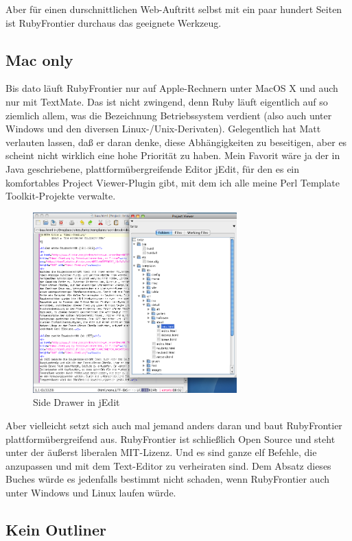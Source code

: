 \documentclass[11pt]{report}
\begin{document}
Aber für einen durschnittlichen Web-Auftritt selbst mit ein paar
hundert Seiten ist RubyFrontier durchaus das geeignete Werkzeug.
\subsection{Mac only}
\label{sec-1-1-2-4}


Bis dato läuft RubyFrontier nur auf Apple-Rechnern unter MacOS X und
auch nur mit TextMate. Das ist nicht zwingend, denn Ruby läuft
eigentlich auf so ziemlich allem, was die Bezeichnung Betriebssystem
verdient (also auch unter Windows und den diversen
Linux-/Unix-Derivaten). Gelegentlich hat Matt verlauten lassen, daß er
daran denke, diese Abhängigkeiten zu beseitigen, aber es scheint nicht
wirklich eine hohe Priorität zu haben. Mein Favorit wäre ja der in
Java geschriebene, plattformübergreifende Editor jEdit, für den es ein
komfortables Project Viewer-Plugin gibt, mit dem ich alle meine Perl
Template Toolkit-Projekte verwalte.

\begin{figure}[h!]
\centering
\includegraphics[width=0.7\textwidth]{./images/projektviewer-in-jedit.png}
\caption{\label{jeditsidedrawer}Side Drawer in jEdit}
\end{figure}

Aber vielleicht setzt sich auch mal jemand anders daran und baut
RubyFrontier plattformübergreifend aus. RubyFrontier ist schließlich
Open Source und steht unter der äußerst liberalen MIT-Lizenz. Und es
sind ganze elf Befehle, die anzupassen und mit dem Text-Editor zu
verheiraten sind. Dem Absatz dieses Buches würde es jedenfalls
bestimmt nicht schaden, wenn RubyFrontier auch unter Windows und Linux
laufen würde.
\subsection{Kein Outliner}
\label{sec-1-1-2-5}
\end{document}
